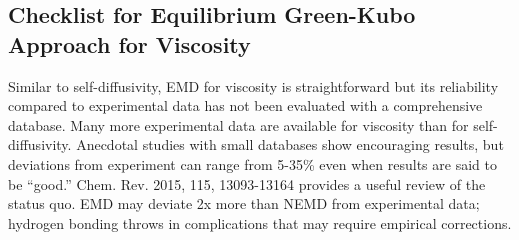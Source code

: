 \documentclass[9pt]{livecoms}
\begin{document}
\subsection{Checklist for Equilibrium Green-Kubo Approach for Viscosity}

Similar to self-diffusivity, EMD for viscosity is straightforward but its reliability compared to experimental data has not been evaluated with a comprehensive database. Many more experimental data are available for viscosity than for self-diffusivity. Anecdotal studies with small databases show encouraging results, but deviations from experiment can range from 5-35\% even when results are said to be “good.” Chem. Rev. 2015, 115, 13093-13164 provides a useful review of the status quo. EMD may deviate 2x more than NEMD from experimental data; hydrogen bonding throws in complications that may require empirical corrections. 


\end{document}
